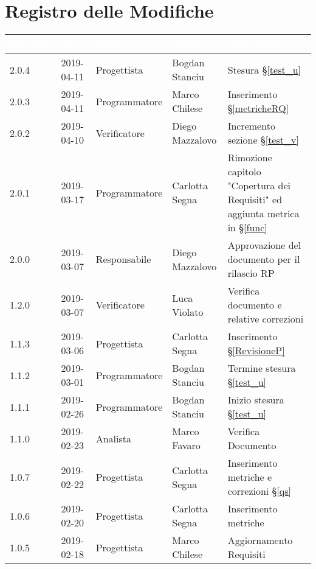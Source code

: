 \section*{Registro delle Modifiche}

\begin{center}
\begin{longtable}[c]{|m{}|m{}|m{}|m{}|p{}|}
\hline
\rowcolor{bluelogo}\textbf{\textcolor{white}{Versione}} & \textbf{\textcolor{white}{Data}} & \textbf{\textcolor{white}{Ruolo}} & \textbf{\textcolor{white}{Autore}} & \textbf{\textcolor{white}{Descrizione}}\\
\hline \hline
\endhead

2.0.4 & 2019-04-11 & Progettista & Bogdan Stanciu & Stesura §\ref{test_u} \\
\hline
2.0.3 & 2019-04-11 & Programmatore & Marco Chilese & Inserimento §\ref{metricheRQ}\\
\hline
\rowcolor{grigio}2.0.2 & 2019-04-10 & Verificatore & Diego Mazzalovo & Incremento sezione §\ref{test_v}\\
\hline
2.0.1 & 2019-03-17 & Programmatore & Carlotta Segna & Rimozione capitolo "Copertura dei Requisiti" ed aggiunta metrica in  §\ref{func}\\
\hline
\rowcolor{grigio}2.0.0 & 2019-03-07 & Responsabile & Diego Mazzalovo & Approvazione del documento per il rilascio RP\\
\hline
1.2.0 & 2019-03-07 & Verificatore & Luca Violato & Verifica documento e relative correzioni\\ 
\hline
\rowcolor{grigio}1.1.3 & 2019-03-06 & Progettista & Carlotta Segna & Inserimento §\ref{RevisioneP} \\
\hline
1.1.2 & 2019-03-01 & Programmatore & Bogdan Stanciu & Termine stesura §\ref{test_u} \\
\hline
\rowcolor{grigio}1.1.1 & 2019-02-26 & Programmatore & Bogdan Stanciu & Inizio stesura §\ref{test_u} \\
\hline
1.1.0 & 2019-02-23 & Analista & Marco Favaro & Verifica Documento\\
\hline
\rowcolor{grigio} 1.0.7 & 2019-02-22 & Progettista & Carlotta Segna & Inserimento metriche e correzioni §\ref{qs}\\
\hline
1.0.6 & 2019-02-20 & Progettista & Carlotta Segna & Inserimento metriche\\
\hline
\rowcolor{grigio} 1.0.5 & 2019-02-18 & Progettista & Marco Chilese & Aggiornamento  Requisiti\\

\end{longtable}
\end{center}
